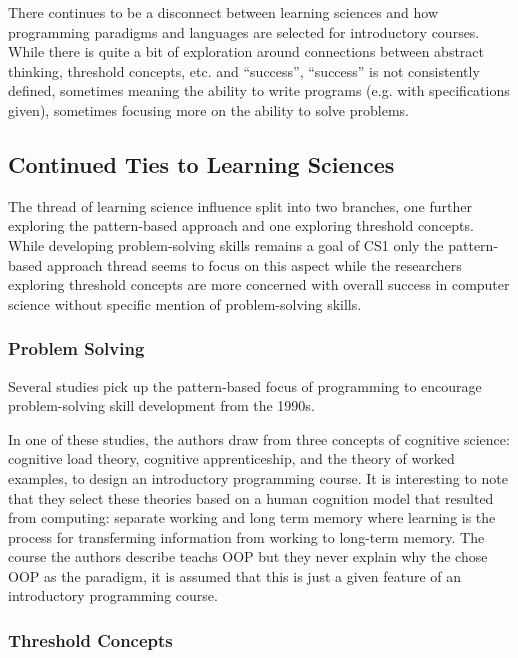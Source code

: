 \documentclass[12pt]{article}
\begin{document}
There continues to be a disconnect between learning sciences and how
programming paradigms and languages are selected for introductory
courses. While there is quite a bit of exploration around connections
between abstract thinking, threshold concepts, etc. and ``success'',
“success” is not consistently defined, sometimes meaning the ability
to write programs (e.g. with specifications given), sometimes focusing
more on the ability to solve problems.

\subsection{Continued Ties to Learning Sciences}

The thread of learning science influence split into two branches, one
further exploring the pattern-based approach and one exploring
threshold concepts. While developing problem-solving skills remains a
goal of CS1 only the pattern-based approach thread seems to focus on
this aspect while the researchers exploring threshold concepts are
more concerned with overall success in computer science without
specific mention of problem-solving skills.

\subsubsection{Problem Solving}

Several studies pick up the pattern-based focus of programming to
encourage problem-solving skill development from the
1990s\autocite{muller_almost_2004,muller_pattern_2005,muller_patternoriented_2007,caspersen_instructional_2007-1}.

In one of these studies, the authors draw from three concepts of
cognitive science: cognitive load theory, cognitive apprenticeship,
and the theory of worked examples, to design an introductory
programming course\autocite{caspersen_instructional_2007-1}. It is
interesting to note that they select these theories based on a human
cognition model that resulted from computing: separate working and
long term memory where learning is the process for transferming
information from working to long-term memory. The course the authors
describe teachs OOP but they never explain why the chose OOP as the
paradigm, it is assumed that this is just a given feature of an
introductory programming course.

\subsubsection{Threshold Concepts}
\end{document}
